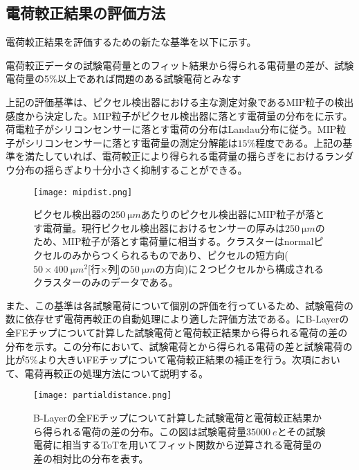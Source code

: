 \subsection{電荷較正結果の評価方法}
電荷較正結果を評価するための新たな基準を以下に示す。
\begin{screen}
電荷較正データの試験電荷量とのフィット結果から得られる電荷量の差が、試験電荷量の5\%以上であれば問題のある試験電荷とみなす
\end{screen}
上記の評価基準は、ピクセル検出器における主な測定対象であるMIP粒子の検出感度から決定した。MIP粒子がピクセル検出器に落とす電荷量の分布をに示す。荷電粒子がシリコンセンサーに落とす電荷の分布はLandau分布に従う。MIP粒子がシリコンセンサーに落とす電荷量の測定分解能は$15\%$程度である。上記の基準を満たしていれば、電荷較正により得られる電荷量の揺らぎをにおけるランダウ分布の揺らぎより十分小さく抑制することができる。

\begin{figure}[tbp]
  \centering
  \texttt{[image: mipdist.png]}
  \caption[MIP粒子がピクセル検出器に落とす電荷量]{ピクセル検出器の$250\ \si{\micro m}$あたりのピクセル検出器にMIP粒子が落とす電荷量。現行ピクセル検出器におけるセンサーの厚みは$250\ \si{\micro m}$のため、MIP粒子が落とす電荷量に相当する。クラスターはnormalピクセルのみからつくられるものであり、ピクセルの短方向($50\times400\ \si{\micro m^2}$[行$\times$列]の$50\ \si{\micro m}$の方向)に２つピクセルから構成されるクラスターのみのデータである。}
  \label{fig:mipdist}
\end{figure}


また、この基準は各試験電荷について個別の評価を行っているため、試験電荷の数に依存せず電荷再較正の自動処理により適した評価方法である。にB-Layerの全FEチップについて計算した試験電荷と電荷較正結果から得られる電荷の差の分布を示す。この分布において、試験電荷とから得られる電荷の差と試験電荷の比が$5\% $より大きいFEチップについて電荷較正結果の補正を行う。次項において、電荷再較正の処理方法について説明する。

\begin{figure}[tbp]
  \centering
  \texttt{[image: partialdistance.png]}
  \caption[B-Layerの全FEチップについて計算した試験電荷と電荷較正結果から得られる電荷の差の分布]{B-Layerの全FEチップについて計算した試験電荷と電荷較正結果から得られる電荷の差の分布。この図は試験電荷量$35000\ \si{e}$とその試験電荷に相当するToTを用いてフィット関数から逆算される電荷量の差の相対比の分布を表す。}
  \label{fig:partialdistance}
\end{figure}


